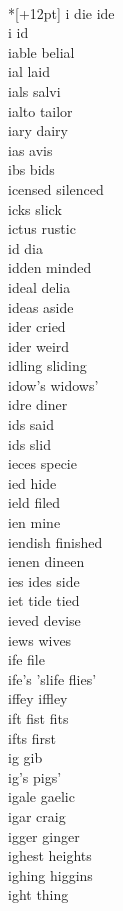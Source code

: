 \vspace{14pt}
\noindent\notextbf{\LargeI}\\*[+12pt]
i die ide  \\
i id \\
iable belial \\
ial laid \\
ials salvi \\
ialto tailor \\
iary dairy \\
ias avis \\
ibs bids \\
icensed silenced \\
icks slick \\
ictus rustic \\
id dia \\
idden minded \\
ideal delia\\
ideas aside\\
ider cried \\
ider weird \\
idling sliding \\
idow's widows' \\
idre diner \\
ids said \\
ids slid \\
ieces specie \\
ied hide \\
ield filed \\
ien mine \\
iendish finished \\
ienen dineen \\
ies ides side \\
iet tide tied \\
ieved devise \\
iews wives \\
ife file \\
ife's 'slife flies' \\
iffey iffley \\
ift fist fits \\
ifts first \\
ig gib \\
ig's pigs' \\
igale gaelic \\
igar craig \\
igger ginger \\
ighest heights \\
ighing higgins \\
ight thing \\
